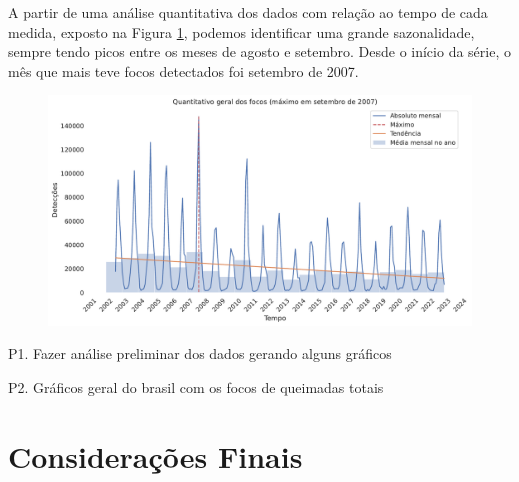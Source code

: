 \documentclass[cic,tc]{iiufrgs}
\begin{document}
A partir de uma análise quantitativa dos dados com relação ao tempo de cada medida,
exposto na Figura \ref{fig:quantitativo_geral}, podemos identificar uma grande 
sazonalidade, sempre tendo picos entre os meses de agosto e setembro. Desde o 
início da série, o mês que mais teve focos detectados foi setembro de 2007. 

\begin{figure}
    \caption{}
    \begin{center}
        \includegraphics[width=35em]{quantitativo_geral}
    \end{center}
    \label{fig:quantitativo_geral}
\end{figure}


P1. Fazer análise preliminar dos dados gerando alguns gráficos \par
P2. Gráficos geral do brasil com os focos de queimadas totais \cite{geographicDataSciencePython} \par



\chapter{Considerações Finais}





\end{document}

